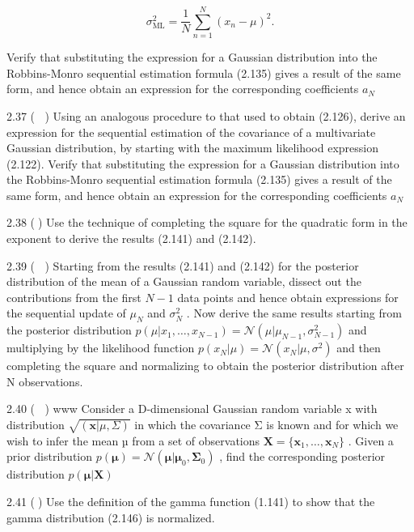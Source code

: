 \documentclass[
  10
]{article}
\begin{document}
\[
\sigma_ {\mathrm{ML}} ^ {2} = \frac {1}{N} \sum_ {n = 1} ^ {N} (x _ {n} - \mu) ^ {2}.\tag{2.292}
\]

Verify that substituting the expression for a Gaussian distribution into
the Robbins-Monro sequential estimation formula (2.135) gives a result
of the same form, and hence obtain an expression for the corresponding
coefficients \(a _ { N }\)

2.37 ( ) Using an analogous procedure to that used to obtain (2.126),
derive an expression for the sequential estimation of the covariance of
a multivariate Gaussian distribution, by starting with the maximum
likelihood expression (2.122). Verify that substituting the expression
for a Gaussian distribution into the Robbins-Monro sequential estimation
formula (2.135) gives a result of the same form, and hence obtain an
expression for the corresponding coefficients \(a _ { N }\)

2.38 () Use the technique of completing the square for the quadratic
form in the exponent to derive the results (2.141) and (2.142).

2.39 ( ) Starting from the results (2.141) and (2.142) for the posterior
distribution of the mean of a Gaussian random variable, dissect out the
contributions from the first \(N - 1\) data points and hence obtain
expressions for the sequential update of \(\mu _ { N }\) and
\(\sigma _ { N } ^ { 2 }\) . Now derive the same results starting from
the posterior distribution
\(p ( \mu | x _ { 1 } , \ldots , x _ { N - 1 } ) = \mathcal { N } ( \mu | \mu _ { N - 1 } , \sigma _ { N - 1 } ^ { 2 } )\)
and multiplying by the likelihood function
\(p ( x _ { N } | \mu ) = \mathcal { N } ( x _ { N } | \mu , \sigma ^ { 2 } )\)
and then completing the square and normalizing to obtain the posterior
distribution after N observations.

2.40 ( ) www Consider a D-dimensional Gaussian random variable x with
distribution \(\sqrt { ( \mathbf { x } | \mu , \Sigma ) }\) in which the
covariance Σ is known and for which we wish to infer the mean µ from a
set of observations
\(\mathbf { X } = \{ \mathbf { x } _ { 1 } , \ldots , \mathbf { x } _ { N } \}\)
. Given a prior distribution
\(p ( \pmb { \mu } ) = \mathcal { N } ( \pmb { \mu } | \pmb { \mu } _ { 0 } , \pmb { \Sigma } _ { 0 } )\)
, find the corresponding posterior distribution
\(p ( { \boldsymbol { \mu } } | \mathbf { X } )\)

2.41 () Use the definition of the gamma function (1.141) to show that
the gamma distribution (2.146) is normalized.
\end{document}
